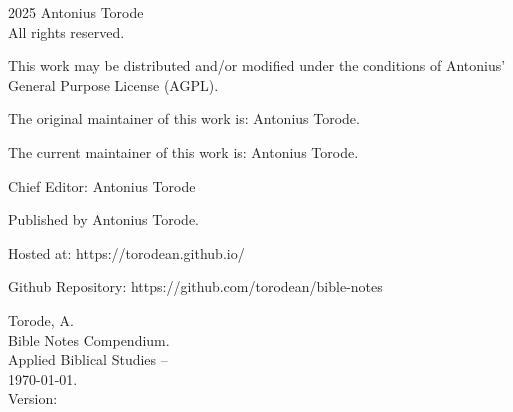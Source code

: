 \pagestyle{empty}
\begingroup
\footnotesize
\parindent 0pt
\parskip \baselineskip
\textcopyright{} 2025 Antonius Torode \\
All rights reserved.

This work may be distributed and/or modified under the conditions of Antonius’ General Purpose License (AGPL).

The original maintainer of this work is: Antonius Torode.

The current maintainer of this work is: Antonius Torode.

Chief Editor: Antonius Torode

Published by Antonius Torode. 

Hosted at: https://torodean.github.io/

Github Repository: https://github.com/torodean/bible-notes

\vfill

Torode, A.\\
\hspace*{1em} Bible Notes Compendium. \\
\hspace*{2em} Applied Biblical Studies -- \\
\hspace*{2em} \today. \\
\hspace*{2em} Version: \version

\endgroup
\clearpage